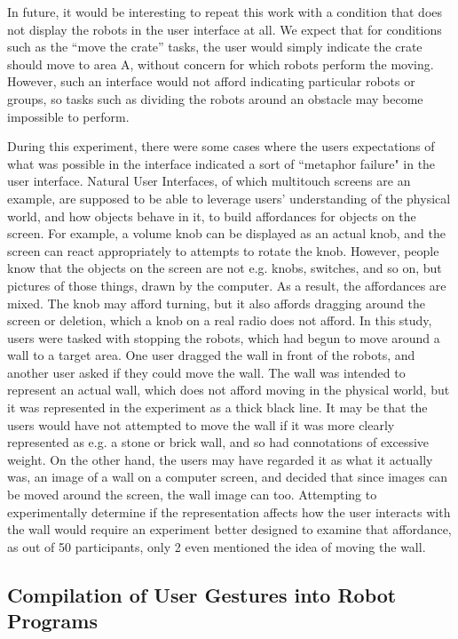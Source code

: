 In future, it would be interesting to repeat this work with a condition that does not display the robots in the user interface at all. 
We expect that for conditions such as the ``move the crate'' tasks, the user would simply indicate the crate should move to area A, without concern for which robots perform the moving. 
However, such an interface would not afford indicating particular robots or groups, so tasks such as dividing the robots around an obstacle may become impossible to perform.

During this experiment, there were some cases where the users expectations of what was possible in the interface indicated a sort of ``metaphor failure" in the user interface. 
Natural User Interfaces, of which multitouch screens are an example, are supposed to be able to leverage users' understanding of the physical world, and how objects behave in it, to build affordances for objects on the screen. 
For example, a volume knob can be displayed as an actual knob, and the screen can react appropriately to attempts to rotate the knob. 
However, people know that the objects on the screen are not e.g. knobs, switches, and so on, but pictures of those things, drawn by the computer. 
As a result, the affordances are mixed. 
The knob may afford turning, but it also affords dragging around the screen or deletion, which a knob on a real radio does not afford. 
In this study, users were tasked with stopping the robots, which had begun to move around a wall to a target area. 
One user dragged the wall in front of the robots, and another user asked if they could move the wall. 
The wall was intended to represent an actual wall, which does not afford moving in the physical world, but it was represented in the experiment as a thick black line. 
It may be that the users would have not attempted to move the wall if it was more clearly represented as e.g. a stone or brick wall, and so had connotations of excessive weight. 
On the other hand, the users may have regarded it as what it actually was, an image of a wall on a computer screen, and decided that since images can be moved around the screen, the wall image can too. 
Attempting to experimentally determine if the representation affects how the user interacts with the wall would require an experiment better designed to examine that affordance, as out of 50 participants, only 2 even mentioned the idea of moving the wall. 

\subsection{Compilation of User Gestures into Robot Programs} \label{section:Compilation_of_User_Gestures_into_Robot_Programs}

